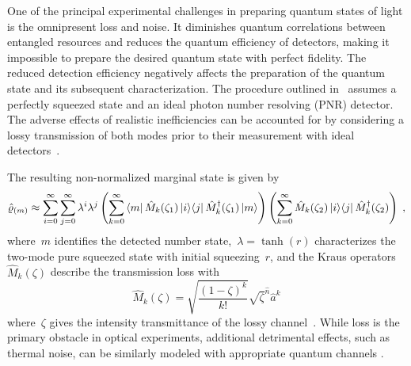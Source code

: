 \documentclass{optica-article}
\begin{document}
One of the principal experimental challenges in preparing quantum states of light is the omnipresent loss and noise. It diminishes quantum correlations between entangled resources and reduces the quantum efficiency of detectors, making it impossible to prepare the desired quantum state with perfect fidelity. The reduced detection efficiency negatively affects the preparation of the quantum state and its subsequent characterization. The procedure outlined in~ assumes a perfectly squeezed state and an ideal photon number resolving (PNR) detector. The adverse effects of realistic inefficiencies can be accounted for by considering a lossy transmission of both modes prior to their measurement with ideal detectors~\cite{feito2009}. 

The resulting non-normalized marginal state is given by
%
\begin{equation}\label{e-pnr-rho}
  \hatrho_{(m)} \approx
  \sum_{i = 0}^{\infty} 
  \sum_{j = 0}^{\infty}
    \lambda^{i} \lambda^{j}
    \left(
      \sum_{k = 0}^{\infty}
        \bra{m} \hat{M}_{k} (\zeta_{1}) \ketbra{i}{j} \hat{M}_{k}^{\dagger} (\zeta_{1}) \ket{m}
    \right)
    \left(
      \sum_{k = 0}^{\infty}
        \hat{M}_{k}(\zeta_{2}) \ketbra{i}{j} \hat{M}_{k}^{\dagger} (\zeta_{2})
    \right) \Qc
\end{equation}
%
where~$m$ identifies the detected number state,~${\lambda = \tanh(r)}$ characterizes the two-mode pure squeezed state with initial squeezing~$r$, and the Kraus operators~${\hat{M}_{k} (\zeta)}$ describe the transmission loss with
%
\begin{equation}
  \hat{M}_{k} (\zeta) =
    \sqrt{ \frac{(1 - \zeta)^{k}}{k!} } 
    \sqrt{\zeta}^{\hat{n}} \hat{a}^{k}
\end{equation}
%
where~$\zeta$ gives the intensity transmittance of the lossy channel~\cite{ivan2011}. While loss is the primary obstacle in optical experiments, additional detrimental effects, such as thermal noise, can be similarly modeled with appropriate quantum channels \cite{ivan2011,gagatsos2017}.
\end{document}
